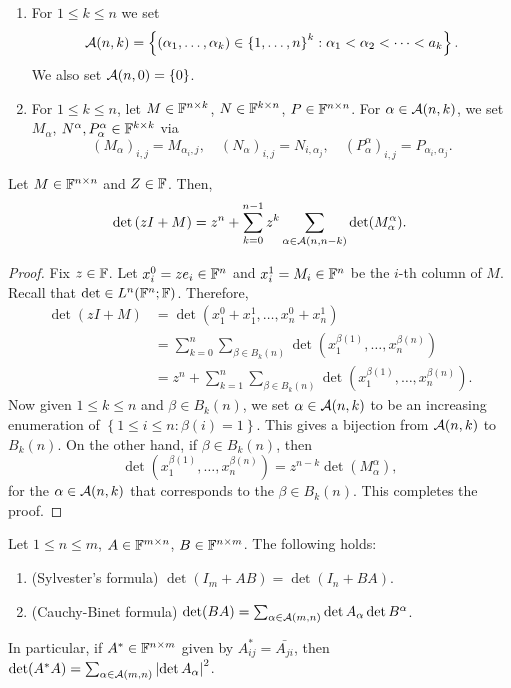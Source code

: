 \documentclass[a4paper]{article}
\begin{document}
\begin{defi}
\begin{enumerate}
\item For $1 \leq k \leq n$ we set
\[
\mathcal{A}(n, k) = \left\{ (\alpha_1, \dots, \alpha_k)
\in \left\{ 1, \dots, n \right\}^k :
\alpha_1 < \alpha_2 < \dots < a_k \right\}.
\]
We also set $\mathcal{A}(n, 0) = \left\{ 0 \right\}$.

\item For $1 \leq k \leq n$, let $M \in \mathbb{F}^{n \times k}$,
$N \in \mathbb{F}^{k \times n}$, $P \in \mathbb{F}^{n \times n}$. For
$\alpha \in \mathcal{A}(n, k)$, we set
$M_\alpha$, $N^\alpha, P_\alpha^\alpha \in \mathbb{F}^{k \times k}$
via
\[
(M_\alpha)_{i, j} = M_{\alpha_i, j}, \quad
(N_\alpha)_{i, j} = N_{i, \alpha_j}, \quad
(P_\alpha^\alpha)_{i, j} = P_{\alpha_i, \alpha_j}.
\]
\end{enumerate}
\end{defi}

\begin{thm}
Let $M \in \mathbb{F}^{n \times n}$ and $Z \in \mathbb{F}$. Then,
\[
\det \left( zI + M \right) = z^n + \sum_{k=0}^{n-1}
z^k \sum_{\alpha \in \mathcal{A}(n, n - k)} \det(M_\alpha^\alpha).
\]
\end{thm}

\begin{proof}
Fix $z \in \mathbb{F}$. Let $x_i^0 = z e_i \in \mathbb{F}^n$ and
$x_i^1 = M_i \in \mathbb{F}^n$ be the $i$-th column of $M$.
Recall that $\det \in L^n (\mathbb{F}^n ; \mathbb{F})$. Therefore,
\[
\begin{aligned}
\det (z I + M)
&= \det (x_1^0 + x_1^1, \dots, x_n^0 + x_n^1) \\
&= \sum_{k=0}^n \sum_{\beta \in B_k(n)}
\det (x_1^{\beta(1)}, \dots, x_n^{\beta(n)}) \\
&= z^n + \sum_{k=1}^n \sum_{\beta \in B_k(n)}
\det (x_1^{\beta(1)}, \dots, x_n^{\beta(n)}).
\end{aligned}
\]
Now given $1 \leq k \leq n$ and $\beta \in B_k(n)$,
we set $\alpha \in \mathcal{A}(n, k)$ to be an increasing
enumeration of $\left\{ 1 \leq i \leq n : \beta(i) = 1
\right\}$. This gives a bijection from $\mathcal{A}(n, k)$
to $B_k(n)$. On the other hand, if $\beta \in B_k(n)$,
then
\[
\det (x_1^{\beta(1)}, \dots, x_n^{\beta(n)})
= z^{n - k} \det(M_\alpha^\alpha),
\]
for the $\alpha \in \mathcal{A}(n, k)$ that corresponds to
the $\beta \in B_k(n)$. This completes the proof.
\end{proof}

\begin{thm}
Let $1 \leq n \leq m$, $A \in \mathbb{F}^{m \times n}$,
$B \in \mathbb{F}^{n \times m}$. The following holds:
\begin{enumerate}
\item (Sylvester's formula) $\det(I_m + A B)
= \det(I_n + BA)$.

\item (Cauchy-Binet formula) $\det(BA) = \sum_{\alpha
\in \mathcal{A}(m, n)} \det A_\alpha \det B^\alpha$.
\end{enumerate}
In particular, if $A^* \in \mathbb{F}^{n \times m}$ given
by $A^*_{ij} = \bar{A_{ji}}$, then
$\det(A^* A) = \sum_{\alpha \in \mathcal{A}(m, n)}
\left\lvert \det A_\alpha\right\rvert^2$.
\end{thm}
\end{document}

